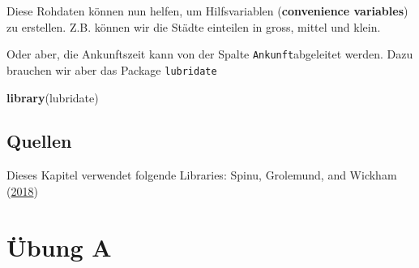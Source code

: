 \documentclass[]{book}
\newenvironment{Shaded}{\begin{snugshade}}{\end{snugshade}}
\newcommand{\DecValTok}[1]{\textcolor[rgb]{0.00,0.00,0.81}{#1}}
\newcommand{\KeywordTok}[1]{\textcolor[rgb]{0.13,0.29,0.53}{\textbf{#1}}}
\newcommand{\NormalTok}[1]{#1}
\newcommand{\OperatorTok}[1]{\textcolor[rgb]{0.81,0.36,0.00}{\textbf{#1}}}
\newcommand{\StringTok}[1]{\textcolor[rgb]{0.31,0.60,0.02}{#1}}
\begin{document}
Diese Rohdaten können nun helfen, um Hilfsvariablen (\textbf{convenience variables}) zu erstellen. Z.B. können wir die Städte einteilen in gross, mittel und klein.

\begin{Shaded}
\end{Shaded}

Oder aber, die Ankunftszeit kann von der Spalte \texttt{Ankunft}abgeleitet werden. Dazu brauchen wir aber das Package \texttt{lubridate}

\begin{Shaded}
\begin{Highlighting}[]
\KeywordTok{library}\NormalTok{(lubridate)}
\end{Highlighting}
\end{Shaded}

\begin{Shaded}
\end{Shaded}

\hypertarget{quellen}{%
\subsection{Quellen}\label{quellen}}

Dieses Kapitel verwendet folgende Libraries: Spinu, Grolemund, and Wickham (\protect\hyperlink{ref-R-lubridate}{2018})

\hypertarget{ubung-a}{%
\section{Übung A}\label{ubung-a}}
\end{document}
